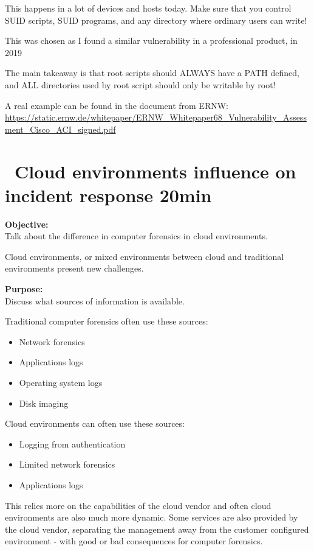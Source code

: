 \documentclass[a4paper,11pt,notitlepage]{report}
\begin{document}
This happens in a lot of devices and hosts today. Make sure that you control SUID scripts, SUID programs, and any directory where ordinary users can write!

This was chosen as I found a similar vulnerability in a professional product, in 2019

The main takeaway is that root scripts should ALWAYS have a PATH defined, and ALL directories used by root script should only be writable by root!

A real example can be found in the document from ERNW: \\
{\small\url{https://static.ernw.de/whitepaper/ERNW_Whitepaper68_Vulnerability_Assessment_Cisco_ACI_signed.pdf}}


\chapter{\faInfoCircle\ Cloud environments influence on incident response 20min}
\label{ex:cloud-incident-response}

{\bf Objective:}\\
Talk about the difference in computer forensics in cloud environments.

Cloud environments, or mixed environments between cloud and traditional environments present new challenges.

{\bf Purpose:}\\
Discuss what sources of information is available.

Traditional computer forensics often use these sources:
\begin{itemize}
\item Network forensics
\item Applications logs
\item Operating system logs
\item Disk imaging
\end{itemize}

Cloud environments can often use these sources:

\begin{itemize}
\item Logging from authentication
\item Limited network forensics
\item Applications logs
\end{itemize}

This relies more on the capabilities of the cloud vendor and often cloud environments are also much more dynamic. Some services are also provided by the cloud vendor, separating the management away from the customer configured environment - with good or bad consequences for computer forensics.
\end{document}
